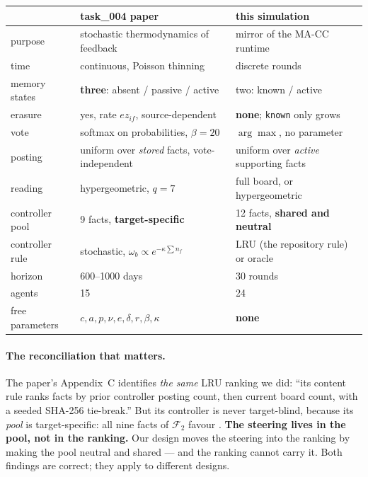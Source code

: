 \documentclass[11pt,a4paper]{article}
\begin{document}
\begin{table}[h]\centering\small
\begin{tabular}{p{4.0cm}p{5.0cm}p{5.0cm}}\toprule
& \textbf{task\_004 paper} & \textbf{this simulation}\\\midrule
purpose & stochastic thermodynamics of feedback & mirror of the MA-CC runtime\\
time & continuous, Poisson thinning & discrete rounds\\
memory states & \textbf{three}: absent / passive / active & two: known / active\\
erasure & yes, rate $e z_{if}$, source-dependent & \textbf{none}; \texttt{known} only grows\\
vote & softmax on probabilities, $\beta=20$ & $\arg\max$, no parameter\\
posting & uniform over \emph{stored} facts, vote-independent & uniform over \emph{active} supporting facts\\
reading & hypergeometric, $q=7$ & full board, or hypergeometric\\
controller pool & 9 facts, \textbf{target-specific} & 12 facts, \textbf{shared and neutral}\\
controller rule & stochastic, $\omega_b\!\propto\!e^{-\kappa\sum n_f}$ & LRU (the repository rule) or oracle\\
horizon & 600--1000 days & 30 rounds\\
agents & 15 & 24\\
free parameters & $c,a,p,\nu,e,\delta,r,\beta,\kappa$ & \textbf{none}\\
\bottomrule\end{tabular}\end{table}

\paragraph{The reconciliation that matters.} The paper's Appendix~C identifies
\emph{the same} LRU ranking we did: ``its content rule ranks facts by prior
controller posting count, then current board count, with a seeded SHA-256
tie-break.'' But its controller is never target-blind, because its \emph{pool}
is target-specific: all nine facts of $\mathcal F_2$ favour . \textbf{The
steering lives in the pool, not in the ranking.} Our design moves the steering
into the ranking by making the pool neutral and shared --- and the ranking
cannot carry it. Both findings are correct; they apply to different designs.
\end{document}
